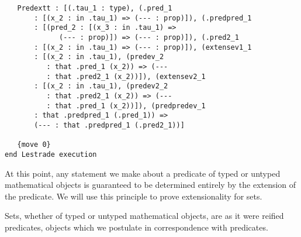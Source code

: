 \documentclass[12pt]{article}
\begin{document}
\begin{verbatim}
   Predextt : [(.tau_1 : type), (.pred_1 
       : [(x_2 : in .tau_1) => (--- : prop)]), (.predpred_1 
       : [(pred_2 : [(x_3 : in .tau_1) => 
             (--- : prop)]) => (--- : prop)]), (.pred2_1 
       : [(x_2 : in .tau_1) => (--- : prop)]), (extensev1_1 
       : [(x_2 : in .tau_1), (predev_2 
          : that .pred_1 (x_2)) => (--- 
          : that .pred2_1 (x_2))]), (extensev2_1 
       : [(x_2 : in .tau_1), (predev2_2 
          : that .pred2_1 (x_2)) => (--- 
          : that .pred_1 (x_2))]), (predpredev_1 
       : that .predpred_1 (.pred_1)) => 
       (--- : that .predpred_1 (.pred2_1))]

   {move 0}
end Lestrade execution

\end{verbatim}

At this point, any statement we make about a predicate of typed or untyped mathematical objects is guaranteed to be determined entirely by the extension of the predicate.  We will use this principle to prove extensionality for sets.

Sets, whether of typed or untyped mathematical objects, are as it were reified predicates, objects which we postulate in correspondence with predicates.
\end{document}

